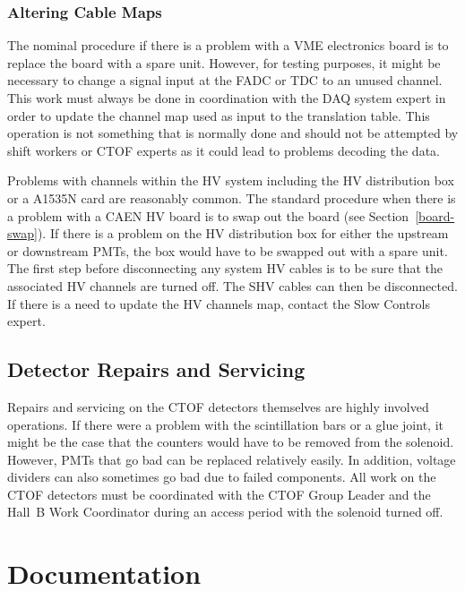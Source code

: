 \documentclass[12pt]{article}
\begin{document}
\subsubsection{Altering Cable Maps}

The nominal procedure if there is a problem with a VME electronics board is to replace the board with a spare
unit. However, for testing purposes, it might be necessary to change a signal input at the FADC or TDC to an
unused channel. This work must always be done in coordination with the DAQ system expert in order to update
the channel map used as input to the translation table. This operation is not something that is normally done and
should not be attempted by shift workers or CTOF experts as it could lead to problems decoding the data.

Problems with channels within the HV system including the HV distribution box or a A1535N card are reasonably
common. The standard procedure when there is a problem with a CAEN HV board is to swap out the board (see
Section~\ref{board-swap}). If there is a problem on the HV distribution box for either the upstream or
downstream PMTs, the box would have to be swapped out with a spare unit. The first step before disconnecting
any system HV cables is to be sure that the associated HV channels are turned off. The SHV cables can then be
disconnected. If there is a need to update the HV channels map, contact the Slow Controls expert.

\subsection{Detector Repairs and Servicing}

Repairs and servicing on the CTOF detectors themselves are highly involved operations. If there were a problem
with the scintillation bars or a glue joint, it might be the case that the counters would have to be removed from
the solenoid. However, PMTs that go bad can be replaced relatively easily. In addition, voltage dividers can also 
sometimes go bad due to failed components. All work on the CTOF detectors must be coordinated with the CTOF
Group Leader and the Hall~B Work Coordinator during an access period with the solenoid turned off.

\clearpage

\vfil
\eject

\section{Documentation}
\end{document}
